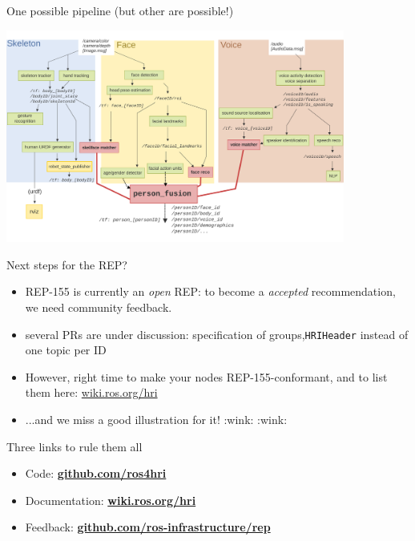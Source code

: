\documentclass[xcolor=table,aspectratio=169]{beamer}
\begin{document}
\begin{frame}{One possible pipeline (but other are possible!)}
    \begin{center}
        \includegraphics[height=7cm]{ros4hri/ros4hri-pipeline2}
    \end{center}
\end{frame}



\begin{frame}{Next steps for the REP?}
    \begin{itemize}
        \item<+-> REP-155 is currently an \emph{open} REP: to become a
            \emph{accepted} recommendation, we need community feedback.

        \item<+-> several PRs are under discussion: specification of
            groups,\texttt{HRIHeader} instead of one topic per ID
        \item<+-> However, right time to make your nodes REP-155-conformant, and to list them here:
            \href{https://wiki.ros.org/hri}{wiki.ros.org/hri}
        \item<+-> ...and we miss a good illustration for it! :wink: :wink:
    \end{itemize}
\end{frame}


\begin{frame}{Three links to rule them all}
    \Large
\begin{itemize}
    \item Code: \textbf{\href{https://github.com/ros4hri/}{github.com/ros4hri}}
    \item Documentation: \textbf{\href{https://wiki.ros.org/hri}{wiki.ros.org/hri}}
    \item Feedback:\textbf{
        \href{https://github.com/ros-infrastructure/rep/pulls?q=is\%3Apr+is\%3Aopen+155}{github.com/ros-infrastructure/rep}}
    \end{itemize}
\end{frame}
\end{document}
